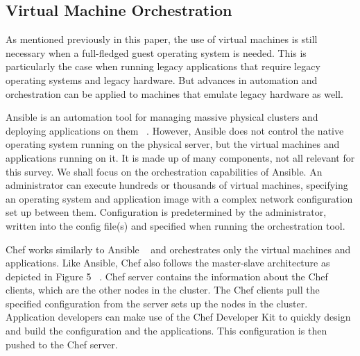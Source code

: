 \documentclass[10pt,twocolumn]{article}
\begin{document}
\subsection{Virtual Machine Orchestration}

As mentioned previously in this paper, the use of virtual machines is still necessary when a full-fledged guest operating system is needed.
This is particularly the case when running legacy applications that require legacy operating systems and legacy hardware.
But advances in automation and orchestration can be applied to machines that emulate legacy hardware as well.

Ansible is an automation tool for managing massive physical clusters and deploying applications on them ~\cite{ansible}.
However, Ansible does not control the native operating system running on the physical server, but the virtual machines and applications running on it.
It is made up of many components, not all relevant for this survey.
We shall focus on the orchestration capabilities of Ansible.
An administrator can execute hundreds or thousands of virtual machines, specifying an operating system and application image with a complex network configuration set up between them.
Configuration is predetermined by the administrator, written into the config file(s) and specified when running the orchestration tool.

Chef works similarly to Ansible ~\cite{chef} and orchestrates only the virtual machines and applications.
Like Ansible, Chef also follows the master-slave architecture as depicted in Figure 5 ~\cite{chef_overview}.
Chef server contains the information about the Chef clients, which are the other nodes in the cluster.
The Chef clients pull the specified configuration from the server sets up the nodes in the cluster.
Application developers can make use of the Chef Developer Kit to quickly design and build the configuration and the applications.
This configuration is then pushed to the Chef server.
\end{document}
